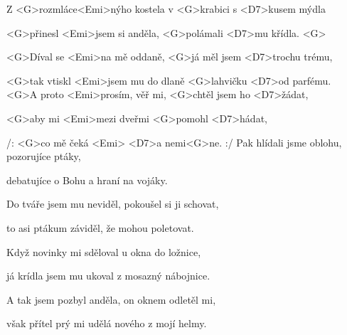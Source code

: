 

\zs
Z <G>rozmláce<Emi>nýho kostela
v <G>krabici s <D7>kusem mýdla

<G>přinesl <Emi>jsem si anděla,
<G>polámali <D7>mu křídla. <G>

<G>Díval se <Emi>na mě oddaně,
<G>já měl jsem <D7>trochu trému,

<G>tak vtiskl <Emi>jsem mu do dlaně 
<G>lahvičku <D7>od parfému.
\ks
\zr
<G>A proto <Emi>prosím, věř mi,
<G>chtěl jsem ho <D7>žádat,

<G>aby mi <Emi>mezi dveřmi
<G>pomohl <D7>hádat,

/: <G>co mě čeká <Emi> <D7>a nemi<G>ne. :/
\kr
\zs
Pak hlídali jsme oblohu, pozorujíce ptáky,

debatujíce o Bohu a hraní na vojáky.

Do tváře jsem mu neviděl, pokoušel si ji schovat,

to asi ptákum záviděl, že mohou poletovat.
\ks

\zr
\kr

\zs
Když novinky mi sděloval u okna do ložnice,

já krídla jsem mu ukoval z mosazný nábojnice.

A tak jsem pozbyl anděla, on oknem odletěl mi,

však přítel prý mi udělá nového z mojí helmy.
\ks

\zr
\kr
\kp
